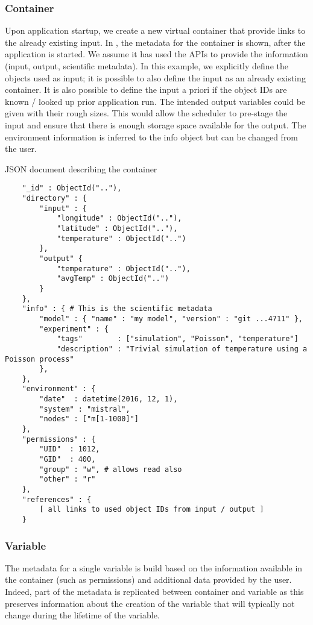 \subsubsection{Container}

Upon application startup, we create a new virtual container that provide links to the already existing input.
In , the metadata for the container is shown, after the application is started.
We assume it has used the APIs to provide the information (input, output, scientific metadata).
In this example, we explicitly define the objects used as input; it is possible to also define
the input as an already existing container.
It is also possible to define the input a priori if the object IDs are known / looked up prior application run.
The intended output variables could be given with their rough sizes.
This would allow the scheduler to pre-stage the input and ensure that there is enough storage space available for the output.
The environment information is inferred to the info object but can be changed from the user.

\begin{tcbcode}[label={lst:mongoContainer}]{JSON document describing the container}
	\begin{lstlisting}
	"_id" : ObjectId(".."),
	"directory" : {
		"input" : {
			"longitude" : ObjectId(".."),
			"latitude" : ObjectId(".."),
			"temperature" : ObjectId("..")
		},
		"output" {
			"temperature" : ObjectId(".."),
			"avgTemp" : ObjectId("..")
		}
	},
	"info" : { # This is the scientific metadata
		"model" : { "name" : "my model", "version" : "git ...4711" },
		"experiment" : {
			"tags"        : ["simulation", "Poisson", "temperature"]
			"description" : "Trivial simulation of temperature using a Poisson process"
		},
	},
	"environment" : {
		"date"  : datetime(2016, 12, 1),
		"system" : "mistral",
		"nodes" : ["m[1-1000]"]
	},
	"permissions" : {
		"UID"  : 1012,
		"GID"  : 400,
		"group" : "w", # allows read also
		"other" : "r"
	},
	"references" : {
		[ all links to used object IDs from input / output ]
	}
	\end{lstlisting}
\end{tcbcode}

\subsubsection{Variable}

The metadata for a single variable is build based on the information available in the container (such as permissions) and additional data provided by the user.
Indeed, part of the metadata is replicated between container and variable as this preserves information about the creation of the variable that will typically not change during the lifetime of the variable.

